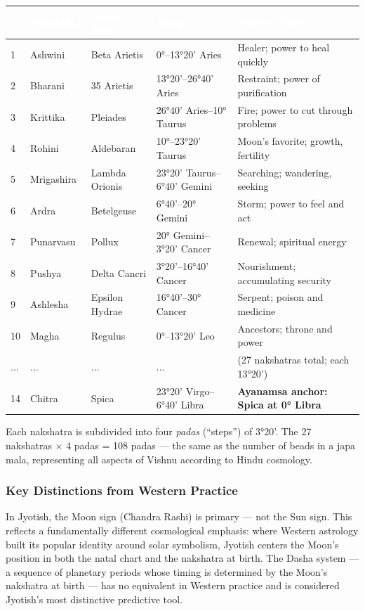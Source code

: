 \documentclass[11pt,letterpaper]{article}
\newcommand{\tableheader}[1]{\textbf{\sffamily\textcolor{white}{#1}}}
\begin{document}
\begin{center}
\begin{tabularx}{\textwidth}{C{0.8cm}L{2.5cm}L{2.5cm}L{2cm}X}
\toprule
{}
\tableheader{\#} & \tableheader{Nakshatra} & \tableheader{Anchor Star} & \tableheader{Range} & \tableheader{Symbol/Power} \\
 & Ashwini & Beta Arietis & 0°--13°20' Aries & Healer; power to heal quickly \\
2 & Bharani & 35 Arietis & 13°20'--26°40' Aries & Restraint; power of purification \\
3 & Krittika & Pleiades & 26°40' Aries--10° Taurus & Fire; power to cut through problems \\
4 & Rohini & Aldebaran & 10°--23°20' Taurus & Moon's favorite; growth, fertility \\
5 & Mrigashira & Lambda Orionis & 23°20' Taurus--6°40' Gemini & Searching; wandering, seeking \\
6 & Ardra & Betelgeuse & 6°40'--20° Gemini & Storm; power to feel and act \\
7 & Punarvasu & Pollux & 20° Gemini--3°20' Cancer & Renewal; spiritual energy \\
8 & Pushya & Delta Cancri & 3°20'--16°40' Cancer & Nourishment; accumulating security \\
9 & Ashlesha & Epsilon Hydrae & 16°40'--30° Cancer & Serpent; poison and medicine \\
10 & Magha & Regulus & 0°--13°20' Leo & Ancestors; throne and power \\
... & ... & ... & ... & (27 nakshatras total; each 13°20') \\
14 & Chitra & Spica & 23°20' Virgo--6°40' Libra & \textbf{Ayanamsa anchor: Spica at 0° Libra} \\
\bottomrule
\end{tabularx}
\end{center}

Each nakshatra is subdivided into four \textit{padas} (``steps'') of 3°20'. The 27 nakshatras × 4 padas = 108 padas --- the same as the number of beads in a japa mala, representing all aspects of Vishnu according to Hindu cosmology.

\subsubsection{Key Distinctions from Western Practice}

In Jyotish, the Moon sign (Chandra Rashi) is primary --- not the Sun sign. This reflects a fundamentally different cosmological emphasis: where Western astrology built its popular identity around solar symbolism, Jyotish centers the Moon's position in both the natal chart and the nakshatra at birth. The Dasha system --- a sequence of planetary periods whose timing is determined by the Moon's nakshatra at birth --- has no equivalent in Western practice and is considered Jyotish's most distinctive predictive tool.
\end{document}
